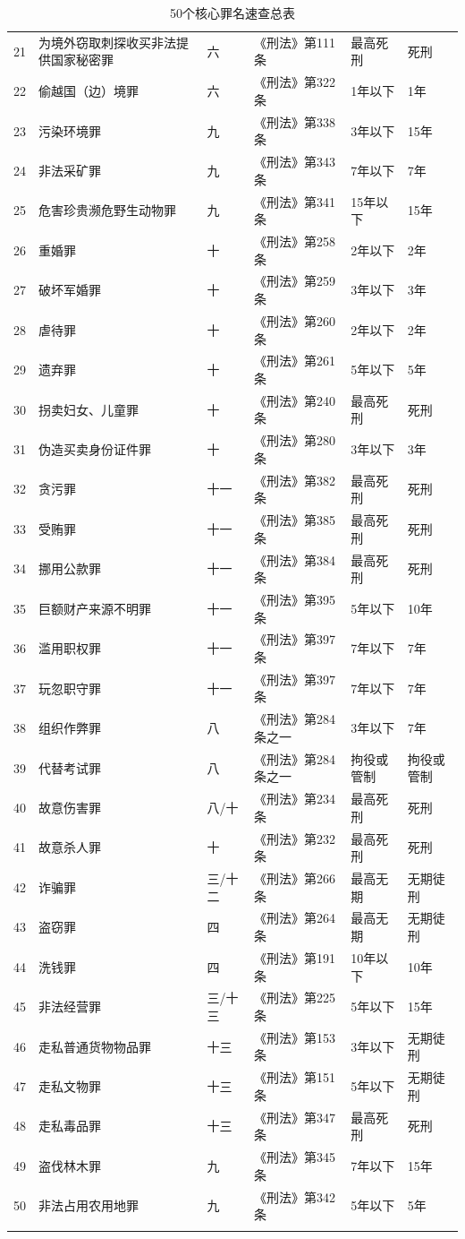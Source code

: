 \documentclass[12pt,a4paper]{article}
\begin{document}
\begin{longtable}{p{0.5cm}p{4cm}p{2cm}p{3cm}p{2cm}p{2cm}}
  21 & 为境外窃取刺探收买非法提供国家秘密罪 & 六 & 《刑法》第111条 & 最高死刑 & 死刑 \\
  22 & 偷越国（边）境罪 & 六 & 《刑法》第322条 & 1年以下 & 1年 \\
  23 & 污染环境罪 & 九 & 《刑法》第338条 & 3年以下 & 15年 \\
  24 & 非法采矿罪 & 九 & 《刑法》第343条 & 7年以下 & 7年 \\
  25 & 危害珍贵濒危野生动物罪 & 九 & 《刑法》第341条 & 15年以下 & 15年 \\
  26 & 重婚罪 & 十 & 《刑法》第258条 & 2年以下 & 2年 \\
  27 & 破坏军婚罪 & 十 & 《刑法》第259条 & 3年以下 & 3年 \\
  28 & 虐待罪 & 十 & 《刑法》第260条 & 2年以下 & 2年 \\
  29 & 遗弃罪 & 十 & 《刑法》第261条 & 5年以下 & 5年 \\
  30 & 拐卖妇女、儿童罪 & 十 & 《刑法》第240条 & 最高死刑 & 死刑 \\
  31 & 伪造买卖身份证件罪 & 十 & 《刑法》第280条 & 3年以下 & 3年 \\
  32 & 贪污罪 & 十一 & 《刑法》第382条 & 最高死刑 & 死刑 \\
  33 & 受贿罪 & 十一 & 《刑法》第385条 & 最高死刑 & 死刑 \\
  34 & 挪用公款罪 & 十一 & 《刑法》第384条 & 最高死刑 & 死刑 \\
  35 & 巨额财产来源不明罪 & 十一 & 《刑法》第395条 & 5年以下 & 10年 \\
  36 & 滥用职权罪 & 十一 & 《刑法》第397条 & 7年以下 & 7年 \\
  37 & 玩忽职守罪 & 十一 & 《刑法》第397条 & 7年以下 & 7年 \\
  38 & 组织作弊罪 & 八 & 《刑法》第284条之一 & 3年以下 & 7年 \\
  39 & 代替考试罪 & 八 & 《刑法》第284条之一 & 拘役或管制 & 拘役或管制 \\
  40 & 故意伤害罪 & 八/十 & 《刑法》第234条 & 最高死刑 & 死刑 \\
  41 & 故意杀人罪 & 十 & 《刑法》第232条 & 最高死刑 & 死刑 \\
  42 & 诈骗罪 & 三/十二 & 《刑法》第266条 & 最高无期 & 无期徒刑 \\
  43 & 盗窃罪 & 四 & 《刑法》第264条 & 最高无期 & 无期徒刑 \\
  44 & 洗钱罪 & 四 & 《刑法》第191条 & 10年以下 & 10年 \\
  45 & 非法经营罪 & 三/十三 & 《刑法》第225条 & 5年以下 & 15年 \\
  46 & 走私普通货物物品罪 & 十三 & 《刑法》第153条 & 3年以下 & 无期徒刑 \\
  47 & 走私文物罪 & 十三 & 《刑法》第151条 & 5年以下 & 无期徒刑 \\
  48 & 走私毒品罪 & 十三 & 《刑法》第347条 & 最高死刑 & 死刑 \\
  49 & 盗伐林木罪 & 九 & 《刑法》第345条 & 7年以下 & 15年 \\
  50 & 非法占用农用地罪 & 九 & 《刑法》第342条 & 5年以下 & 5年 \\
  \bottomrule
  \caption{50个核心罪名速查总表}
\end{longtable}
\end{document}
